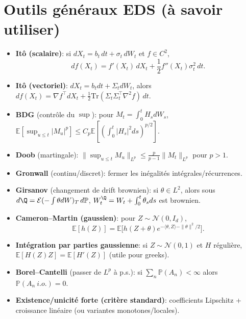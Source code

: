 \documentclass[11pt,a4paper]{article}
\newcommand{\E}{\mathbb{E}}
\newcommand{\Pp}{\mathbb{P}}
\newcommand{\1}{\mathbbm{1}}
\theoremstyle{plain}
\theoremstyle{definition}
\begin{document}
\section{Outils généraux EDS (à savoir utiliser)}
\begin{itemize}[leftmargin=*]
  \item \textbf{Itô (scalaire)}: si $dX_t=b_t\,dt+\sigma_t\,dW_t$ et $f\in C^2$,
  \[
  df(X_t)=f'(X_t)\,dX_t+\frac12 f''(X_t)\sigma_t^2\,dt.
  \]
  \item \textbf{Itô (vectoriel)}: $dX_t=b_tdt+\Sigma_t dW_t$, alors $df(X_t)=\nabla f^\top dX_t+\frac12 \mathrm{Tr}(\Sigma_t\Sigma_t^\top \nabla^2 f)\,dt$.
  \item \textbf{BDG} (contrôle du $\sup$): pour $M_t=\int_0^t H_s dW_s$, $\E[\sup_{u\le t}|M_u|^p]\le C_p\E[(\int_0^t |H_s|^2ds)^{p/2}]$.
  \item \textbf{Doob} (martingale): $\| \sup_{u\le t}M_u\|_{L^p}\le \frac{p}{p-1}\|M_t\|_{L^p}$ pour $p>1$.
  \item \textbf{Gronwall} (continu/discret): fermer les inégalités intégrales/récurrences.
  \item \textbf{Girsanov} (changement de drift brownien): si $\theta\in L^2$, alors sous $d\Q=\mathcal E(-\int\theta dW)_T\,d\Pp$, $W_t^\Q=W_t+\int_0^t\theta_sds$ est brownien.
  \item \textbf{Cameron--Martin (gaussien)}: pour $Z\sim\mathcal N(0,I_d)$,
  \[
  \E[h(Z)]=\E\big[h(Z+\theta)e^{-\langle\theta,Z\rangle-\|\theta\|^2/2}\big].
  \]
  \item \textbf{Intégration par parties gaussienne}: si $Z\sim\mathcal N(0,1)$ et $H$ régulière,
  $\E[H(Z)Z]=\E[H'(Z)]$ (utile pour greeks).
  \item \textbf{Borel--Cantelli} (passer de $L^p$ à p.s.): si $\sum_n\Pp(A_n)<\infty$ alors $\Pp(A_n\ i.o.)=0$.
  \item \textbf{Existence/unicité forte (critère standard)}: coefficients Lipschitz + croissance linéaire (ou variantes monotones/locales).
\end{itemize}
\end{document}
